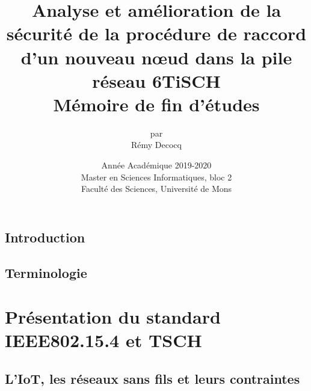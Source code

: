 \documentclass[]{report}
\begin{document}
\title{
{\Huge Analyse et amélioration de la sécurité de la procédure de raccord d'un nouveau nœud dans la pile réseau 6TiSCH}\\
\vspace{0.5cm}
{\huge Mémoire de fin d'études}\\
}



\author{
\vspace{0.9cm}
{\Large par}\\
\huge{Rémy Decocq}
}

\date{
\vspace{8.5cm}
Année Académique 2019-2020\\
Master en Sciences Informatiques, bloc 2\\
Faculté des Sciences, Université de Mons}

\maketitle          

\thispagestyle{empty}   

\newpage

\tableofcontents

\newpage


\section*{Introduction}
\newpage

\section*{Terminologie}
\newpage



\chapter{Présentation du standard IEEE802.15.4 et TSCH}
\newpage

\section{L'IoT, les réseaux sans fils et leurs contraintes}
\label{WSNs}
\end{document}
